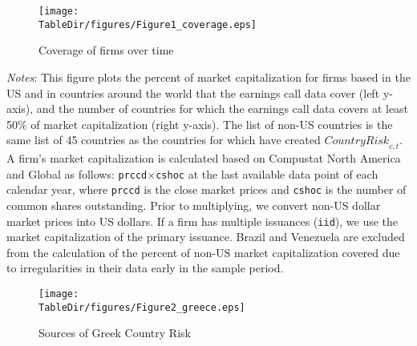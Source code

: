 \documentclass[12pt,oneside,leqno]{article}
\newcommand*{\TableDir}{.}
\begin{document}
\clearpage
\begin{figure}[!h]
\centering
\caption{Coverage of firms over time}\label{fig:coverage}
\texttt{[image: \\TableDir/figures/Figure1\_coverage.eps]}

\end{figure}
\vspace{-.1in}
\begin{minipage}[!h]{.9\textwidth}
\footnotesize\textit{Notes}: This figure plots the percent of market capitalization for firms based in the US and in countries around the world that the earnings call data cover (left y-axis), and the number of countries for which the earnings call data covers at least 50\% of market capitalization (right y-axis). The list of non-US countries is the same list of 45 countries as the countries for which have created $\textit{CountryRisk}_{c,t}$. A firm's market capitalization is calculated based on Compustat North America and Global as follows: \texttt{prccd}$\times$\texttt{cshoc} at the last available data point of each calendar year, where \texttt{prccd} is the close market prices and \texttt{cshoc} is the number of common shares outstanding. Prior to multiplying, we convert non-US dollar market prices into US dollars. If a firm has multiple issuances (\texttt{iid}), we use the market capitalization of the primary issuance. Brazil and Venezuela are excluded from the calculation of the percent of non-US market capitalization covered due to irregularities in their data early in the sample period.
\end{minipage}

\clearpage
\begin{figure}[!h]
\centering\caption{Sources of Greek Country Risk} \label{tab:greece}
\texttt{[image: \\TableDir/figures/Figure2\_greece.eps]}
\end{figure}
\end{document}
